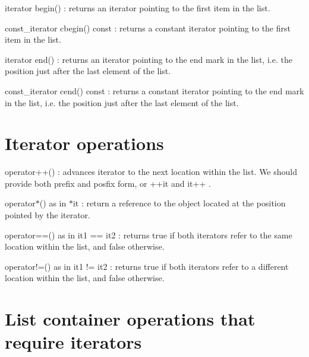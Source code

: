 \begin{DoxyItemize}
\item {\ttfamily iterator begin()} \+: returns an {\ttfamily iterator} pointing to the first item in the list.
\item {\ttfamily const\+\_\+iterator cbegin() const} \+: returns a {\ttfamily constant iterator} pointing to the first item in the list.
\item {\ttfamily iterator end()} \+: returns an {\ttfamily iterator} pointing to the end mark in the list, i.\+e. the position just after the last element of the list.
\item {\ttfamily const\+\_\+iterator cend() const} \+: returns a {\ttfamily constant iterator} pointing to the end mark in the list, i.\+e. the position just after the last element of the list.
\end{DoxyItemize}

\section*{Iterator operations}


\begin{DoxyItemize}
\item {\ttfamily operator++()} \+: advances {\ttfamily iterator} to the next location within the list. We should provide both prefix and posfix form, or {\ttfamily ++it} and {\ttfamily it++} .
\item {\ttfamily operator$\ast$()} as in {\ttfamily $\ast$it} \+: return a reference to the object located at the position pointed by the {\ttfamily iterator}.
\item {\ttfamily operator==()} as in it1 == it2 \+: returns true if both {\ttfamily iterators} refer to the same location within the list, and false otherwise.
\item {\ttfamily operator!=()} as in it1 != it2 \+: returns true if both {\ttfamily iterators} refer to a different location within the list, and false otherwise.
\end{DoxyItemize}

\section*{List container operations that require iterators}


